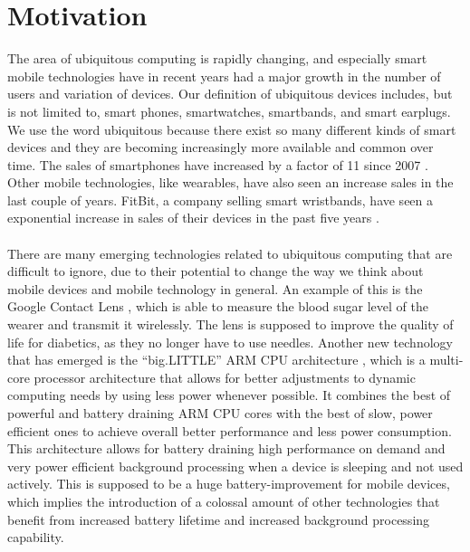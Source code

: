 
\chapter{Motivation}
\label{cha:motivation}

The area of ubiquitous computing is rapidly changing, and especially smart mobile technologies have in recent years had a major growth in the number of users and variation of devices. Our definition of ubiquitous devices includes, but is not limited to, smart phones, smartwatches, smartbands, and smart earplugs. We use the word ubiquitous because there exist so many different kinds of smart devices and they are becoming increasingly more available and common over time. The sales of smartphones have increased by a factor of 11 since 2007 \parencite{statsia_smartphones}. Other mobile technologies, like wearables, have also seen an increase sales in the last couple of years. FitBit, a company selling smart wristbands, have seen a exponential increase in sales of their devices in the past five years \parencite{statsia_fitbit}.
\\\\
There are many emerging technologies related to ubiquitous computing that are difficult to ignore, due to their potential to change the way we think about mobile devices and mobile technology in general. An example of this is the Google Contact Lens \parencite{google_contact_lens}, which is able to measure the blood sugar level of the wearer and transmit it wirelessly. The lens is supposed to improve the quality of life for diabetics, as they no longer have to use needles. Another new technology that has emerged is the ``big.LITTLE'' ARM CPU architecture \parencite{big_little_architecture}, which is a multi-core processor architecture that allows for better adjustments to dynamic computing needs by using less power whenever possible. It combines the best of powerful and battery draining ARM CPU cores with the best of slow, power efficient ones to achieve overall better performance and less power consumption. This architecture allows for battery draining high performance on demand and very power efficient background processing when a device is sleeping and not used actively. This is supposed to be a huge battery-improvement for mobile devices, which implies the introduction of a colossal amount of other technologies that benefit from increased battery lifetime and increased background processing capability. 
